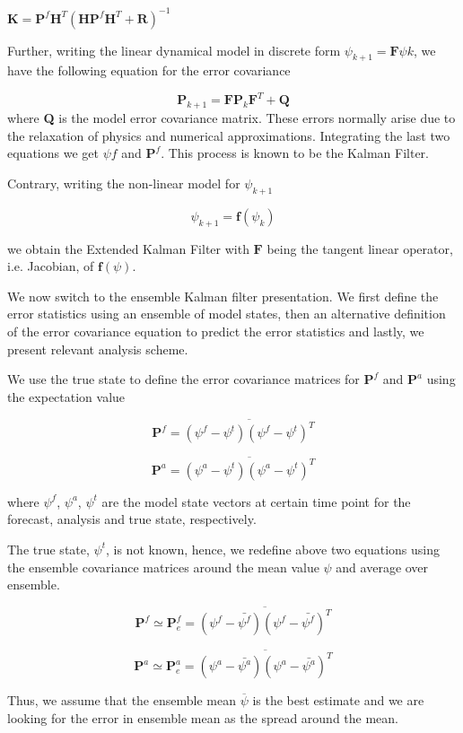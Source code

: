 \documentclass[a4,12pt]{article}
\numberwithin{equation}{section}
\begin{document}
$\textbf{K} = \textbf{P}^{f}\textbf{H}^{T}(\textbf{H}\textbf{P}^{f}\textbf{H}^{T}+\textbf{R})^{-1}$

Further, writing the linear dynamical model in discrete form $\psi_{k+1}=\textbf{F}\psi{k}$, we have the following equation for the error covariance

$$\textbf{P}_{k+1}=\textbf{F}\textbf{P}_{k}\textbf{F}^{T}+\textbf{Q}$$
where \textbf{Q} is the model error covariance matrix. These errors normally arise due to the relaxation of physics and numerical approximations. Integrating the last two equations we get $\psi{f}$ and $\textbf{P}^{f}$. This process is known to be the Kalman Filter.

Contrary, writing the non-linear model for $\psi_{k+1}$

$$\psi_{k+1}=\textbf{f}(\psi_{k})$$

we obtain the Extended Kalman Filter with $\textbf{F}$ being the tangent linear operator, i.e. Jacobian, of $\textbf{f}(\psi)$.

We now switch to the ensemble Kalman filter presentation. We first define the error statistics using an ensemble of model states, then an alternative definition of the error covariance equation to predict the error statistics and lastly, we present relevant analysis scheme.

We use the true state to define the error covariance matrices for $\textbf{P}^{f}$ and $\textbf{P}^{a}$ using the expectation value 

$$\textbf{P}^{f} = \overline{(\psi^{f}-\psi^{t})(\psi^{f}-\psi^{t})^{T}}$$

$$\textbf{P}^{a} = \overline{(\psi^{a}-\psi^{t})(\psi^{a}-\psi^{t})^{T}}$$

where $\psi ^{f}$, $\psi ^{a}$, $\psi ^{t}$ are the model state vectors at certain time point for the forecast, analysis and true state, respectively.

The true state, $\psi ^{t}$, is not known, hence, we redefine above two equations using the ensemble covariance matrices around the mean value $\psi$ and average over ensemble. 

$$\textbf{P}^{f} \simeq \textbf{P}^{f}_{e} = \overline{(\psi^{f}-\bar{\psi^{f}})(\psi^{f}-\bar{\psi^{f}})^{T}}$$

$$\textbf{P}^{a} \simeq \textbf{P}^{a}_{e}= \overline{ (\psi^{a}-\bar {\psi^{a}})(\psi^{a}-\bar{\psi^{a}})^{T} }$$

Thus, we assume that the ensemble mean $\overline {\psi}$ is the best estimate  and we are looking for the error in ensemble mean as the spread around the mean.
\end{document}
